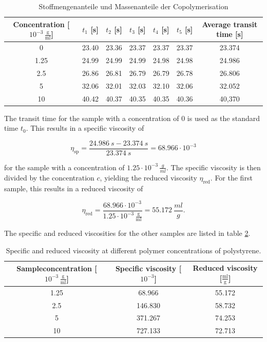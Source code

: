 \documentclass[10pt,a4paper,ngerman]{scrartcl}
\begin{document}
		\begin{table}[H]
			\centering
			\caption{Stoffmengenanteile und Massenanteile der Copolymerisation}
			\label{transittimes}
			\begin{tabular}{c|ccccc|c}
				\toprule
				Concentration [$10^{-3} \, \frac{\text{g}}{\text{ml}}$]& $t_1$ [s] & $t_2$ [s] & $t_3$ [s] & $t_4$ [s] & $t_5$ [s] & Average transit time [s]\\ 
				\midrule
				0 & 23.40 & 23.36 & 23.37 & 23.37 & 23.37 & 23.374 \\
				1.25 & 24.99 & 24.99 & 24.99 & 24.98 & 24.98 & 24.986 \\
				2.5 & 26.86 & 26.81 & 26.79 & 26.79 & 26.78 & 26.806 \\
				5 & 32.06 & 32.01 & 32.03 & 32.10 & 32.06 & 32.052 \\
				10 & 40.42 & 40.37 & 40.35 & 40.35 & 40.36 & 40,370 \\
				\bottomrule
			\end{tabular}
		\end{table}
		
		The transit time for the sample with a concentration of \SI{0}{} is used as the standard time $t_0$. This results in a specific viscosity 
		of 
		
		\begin{equation*}
			\eta_\text{sp} = \frac{\SI{24.986}{s} - \SI{23.374}{s}}{\SI{23.374}{s}} = 68.966 \cdot 10^{-3}
		\end{equation*}
		
		for the sample with a concentration of $1.25 \cdot 10^{-3} \, \frac{g}{ml}$. The specific viscosity is then divided by the concentration $c$, yielding the 
		reduced viscosity $\eta_\text{red}$. For the first sample, this results in a reduced viscosity of 
		
		\begin{equation*}
			\eta_\text{red} = \frac{68.966 \cdot 10^{-3}}{1.25 \cdot 10^{-3} \, \frac{\text{g}}{\text{ml}}} = \SI{55.172}{\frac{ml}{g}} \text{.}
		\end{equation*}

		The specific and reduced viscosities for the other samples are listed in table \ref{specificreduced}.

		\begin{table}[H]
			\centering
			\caption{Specific and reduced viscosity at different polymer concentrations of polystyrene.}
			\label{specificreduced}
			\begin{tabular}{c|c|c}
				\toprule
				Sampleconcentration [$10^{-3} \, \frac{\text{g}}{\text{ml}}$]& Specific viscosity [$10^{-3}$] & Reduced viscosity [$\frac{\text{ml}}{\text{g}}$]\\ 
				\midrule
				1.25 & 68.966 & 55.172 \\
				2.5 & 146.830 & 58.732 \\
				5 & 371.267 & 74.253 \\
				10 & 727.133 & 72.713 \\
				\bottomrule
			\end{tabular}
		\end{table}
\end{document}
